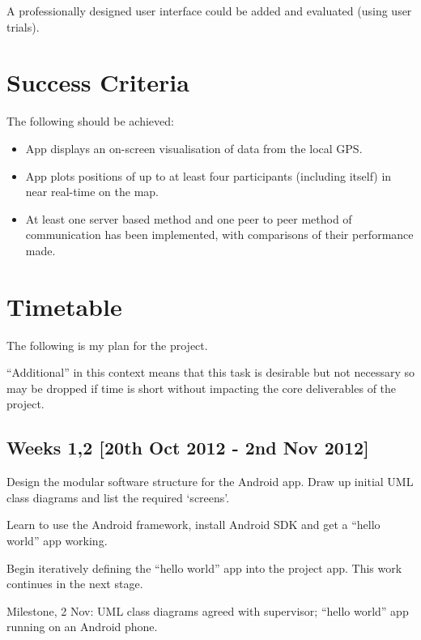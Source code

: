 \documentclass[12pt,twoside,notitlepage]{report}
\begin{document}
A professionally designed user interface could be added and evaluated (using user trials).

\section*{Success Criteria}

The following should be achieved:

\begin{itemize}

\item{App displays an on-screen visualisation of data from the local GPS.}
\item{App plots positions of up to at least four participants (including itself) in near real-time on the map.}
\item{At least one server based method and one peer to peer method of communication has been implemented, with comparisons of their performance made.}

\end{itemize}

\section*{Timetable}

The following is my plan for the project.

``Additional'' in this context means that this task is desirable but not necessary so may be dropped if time is short without impacting the core deliverables of the project.

\subsection*{Weeks 1,2 [20th Oct 2012 - 2nd Nov 2012]}
Design the modular software structure for the Android app.  Draw up initial UML class diagrams and list the required `screens'.

Learn to use the Android framework, install Android SDK and get a ``hello world'' app working.

Begin iteratively defining the ``hello world'' app into the project app.  This work continues in the next stage.

Milestone, 2 Nov: UML class diagrams agreed with supervisor; ``hello world'' app running on an Android phone.
\end{document}
